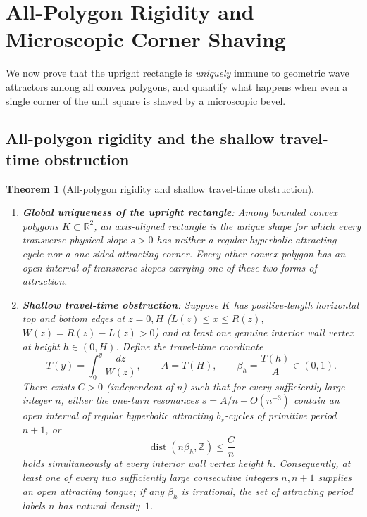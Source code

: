 \documentclass[11pt,reqno]{amsart}
\newtheorem{theorem}{Theorem}[section]
\theoremstyle{definition}
\theoremstyle{remark}
\newcommand{\R}{\mathbb{R}}
\newcommand{\Z}{\mathbb{Z}}
\DeclareMathOperator{\dist}{dist}
\begin{document}
\section{All-Polygon Rigidity and Microscopic Corner Shaving}\label{sec:rigidity}

We now prove that the upright rectangle is \emph{uniquely} immune to geometric wave attractors among all convex polygons, and quantify what happens when even a single corner of the unit square is shaved by a microscopic bevel.

\subsection{All-polygon rigidity and the shallow travel-time obstruction}

\begin{theorem}[All-polygon rigidity and shallow travel-time obstruction]\label{thm:rigidity}
\leavevmode
\begin{enumerate}
  \item \textbf{Global uniqueness of the upright rectangle}: Among bounded convex polygons $K \subset \R^2$, an axis-aligned rectangle is the unique shape for which every transverse physical slope $s > 0$ has neither a regular hyperbolic attracting cycle nor a one-sided attracting corner. Every other convex polygon has an open interval of transverse slopes carrying one of these two forms of attraction.
  \item \textbf{Shallow travel-time obstruction}: Suppose $K$ has positive-length horizontal top and bottom edges at $z = 0, H$ ($L(z) \le x \le R(z)$, $W(z) = R(z) - L(z) > 0$) and at least one genuine interior wall vertex at height $h \in (0, H)$. Define the travel-time coordinate
  \[
    T(y) = \int_0^y \frac{dz}{W(z)}, \qquad A = T(H), \qquad \beta_h = \frac{T(h)}{A} \in (0,1).
  \]
  There exists $C > 0$ (independent of $n$) such that for every sufficiently large integer $n$, either the one-turn resonances $s = A/n + O(n^{-3})$ contain an open interval of regular hyperbolic attracting $b_s$-cycles of primitive period $n+1$, or
  \begin{equation}\label{eq:travel-time}
    \dist(n\beta_h, \Z) \le \frac{C}{n}
  \end{equation}
  holds simultaneously at \emph{every} interior wall vertex height $h$. Consequently, at least one of every two sufficiently large consecutive integers $n, n+1$ supplies an open attracting tongue; if any $\beta_h$ is irrational, the set of attracting period labels $n$ has natural density~$1$.
\end{enumerate}
\end{theorem}
\end{document}
